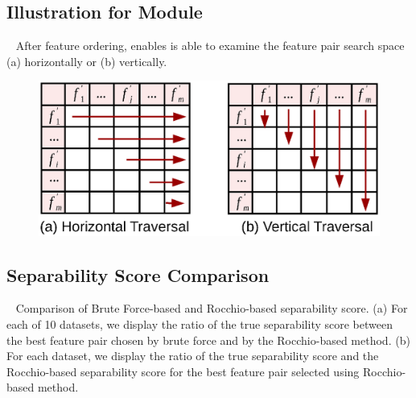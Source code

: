 \subsection{Illustration for \traversal Module}~\label{appF:traversal}
After feature ordering, \traversal enables \genviz is able to examine the feature pair search space (a) horizontally or (b) vertically.
\begin{figure}[!htb]
 \centering
 \includegraphics[width=0.7\linewidth]{fig/traversal.eps}
\vspace{-5mm}
\label{fig:traversal}
\end{figure}


\subsection{Separability Score Comparison}~\label{appF:exp_sep}
Comparison of Brute Force-based and Rocchio-based separability score. (a) For each of 10 datasets, we display the ratio of the true separability score between the best feature pair chosen by brute force and by the Rocchio-based method. (b) For each dataset, we display the ratio of the true separability score and the Rocchio-based separability score for the best feature pair selected using Rocchio-based method.
\begin{figure}[!htb]
\centering %
\vspace{-5mm}
\vspace{-5mm}
\label{fig:brute_rocchio}
\end{figure}


